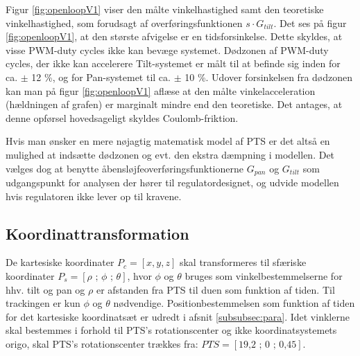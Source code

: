 Figur \ref{fig:openloopV1} viser den målte vinkelhastighed samt den teoretiske vinkelhastighed,
som forudsagt af overføringsfunktionen \(s\cdot{}G_{tilt}\).
Det ses på figur \ref{fig:openloopV1}, at den største afvigelse er en tidsforsinkelse.
Dette skyldes, at visse PWM-duty cycles ikke kan bevæge systemet.
Dødzonen af PWM-duty cycles, der ikke kan accelerere Tilt-systemet er målt til at befinde sig inden for
ca. \(\pm\) 12 \%, og for Pan-systemet til ca. \(\pm\) 10 \%.
Udover forsinkelsen fra dødzonen kan man på figur \ref{fig:openloopV1} aflæse
at den målte vinkelacceleration (hældningen af grafen) er marginalt mindre end den teoretiske.
Det antages, at denne opførsel hovedsageligt skyldes Coulomb-friktion.

Hvis man ønsker en mere nøjagtig matematisk model af PTS
er det altså en mulighed at indsætte dødzonen og evt. den ekstra dæmpning i modellen.
Det vælges dog at benytte åbensløjfeoverføringsfunktionerne \(G_{pan}\) og \(G_{tilt}\)
som udgangspunkt for analysen der hører til regulatordesignet,
og udvide modellen hvis regulatoren ikke lever op til kravene.

\subsection{Koordinattransformation}
\label{sec:koordinattransformation}
De kartesiske koordinater \(P_c=\left[x, y, z\right]\) skal transformeres til sfæriske koordinater
\(P_s=\left[\rho \text{ ; } \phi \text{ ; } \theta\right]\), hvor \(\phi\) og \(\theta\) bruges
som vinkelbestemmelserne for hhv. tilt og pan og \(\rho\) er afstanden fra PTS til duen som funktion af tiden.
Til trackingen er kun \(\phi\) og \(\theta\) nødvendige.
Positionbestemmelsen som funktion af tiden for det kartesiske koordinatsæt er udredt i afsnit \ref{subsubsec:para}.
Idet vinklerne skal bestemmes i forhold til PTS's rotationscenter og ikke koordinatsystemets origo, skal PTS's rotationscenter trækkes fra:
\(PTS=[\text{19,2 ; 0 ; 0,45}]\). 

